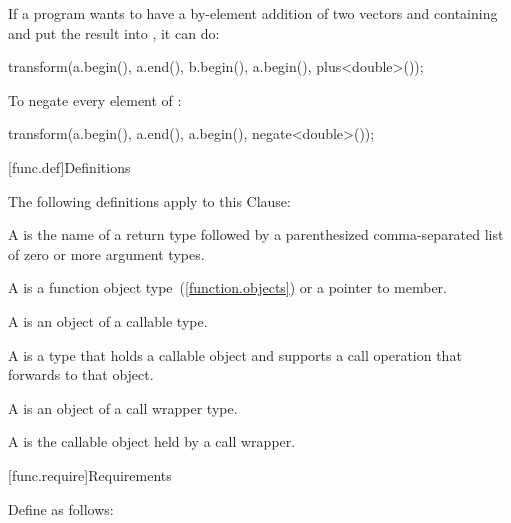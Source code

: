 \pnum
\begin{example}
If a \Cpp program wants to have a by-element addition of two vectors 
and  containing  and put the result into ,
it can do:

\begin{codeblock}
transform(a.begin(), a.end(), b.begin(), a.begin(), plus<double>());
\end{codeblock}
\end{example}

\pnum
\begin{example}
To negate every element of :

\begin{codeblock}
transform(a.begin(), a.end(), a.begin(), negate<double>());
\end{codeblock}

\end{example}

[func.def]{Definitions}

\pnum
The following definitions apply to this Clause:

\pnum
{}%
A  is the name of a return type followed by a
parenthesized comma-separated list of zero or more argument types.

\pnum
{}%
A  is a function object type~(\ref{function.objects}) or a pointer to member.

\pnum
{}%
A  is an object of a callable type.

\pnum
{}%
A  is a type that holds a callable object
and supports a call operation that forwards to that object.

\pnum
{}%
A  is an object of a call wrapper type.

\pnum
{}%
A  is the callable object held by a call wrapper.

[func.require]{Requirements}

\pnum
{}%
Define  as follows:


